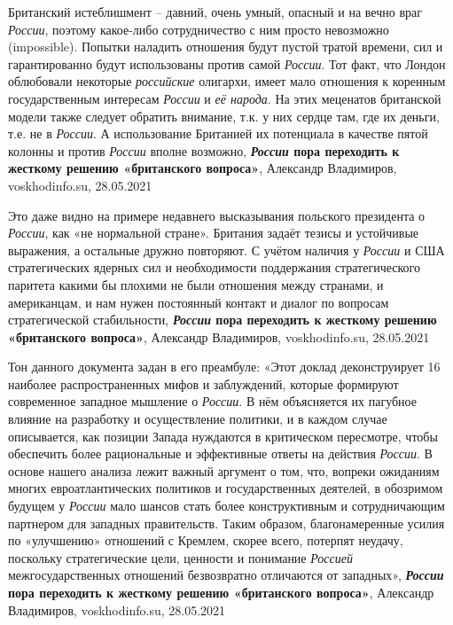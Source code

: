 Британский истеблишмент – давний, очень умный, опасный и на вечно враг \emph{России},
поэтому какое-либо сотрудничество с ним просто невозможно (impossible). Попытки
наладить отношения будут пустой тратой времени, сил и гарантированно будут
использованы против самой \emph{России}.  Тот факт, что Лондон облюбовали некоторые
\emph{российские} олигархи, имеет мало отношения к коренным государственным интересам
\emph{России} и \emph{её народа}. На этих меценатов британской модели также следует обратить
внимание, т.к. у них сердце там, где их деньги, т.е. не в \emph{России}. А
использование Британией их потенциала в качестве пятой колонны и против \emph{России}
вполне возможно,
\textbf{\emph{России} пора переходить к жесткому решению «британского вопроса»}, 
Александр Владимиров, voskhodinfo.su, 28.05.2021

Это даже видно на примере недавнего высказывания польского президента о \emph{России},
как «не нормальной стране». Британия задаёт тезисы и устойчивые выражения, а
остальные дружно повторяют. С учётом наличия у \emph{России} и США стратегических
ядерных сил и необходимости поддержания стратегического паритета какими бы
плохими не были отношения между странами, и американцам, и нам нужен постоянный
контакт и диалог по вопросам стратегической стабильности,
\textbf{\emph{России} пора переходить к жесткому решению «британского вопроса»}, 
Александр Владимиров, voskhodinfo.su, 28.05.2021

Тон данного документа задан в его преамбуле: «Этот доклад деконструирует 16
наиболее распространенных мифов и заблуждений, которые формируют современное
западное мышление о \emph{России}. В нём объясняется их пагубное влияние на
разработку и осуществление политики, и в каждом случае описывается, как позиции
Запада нуждаются в критическом пересмотре, чтобы обеспечить более рациональные
и эффективные ответы на действия \emph{России}. В основе нашего анализа лежит
важный аргумент о том, что, вопреки ожиданиям многих евроатлантических
политиков и государственных деятелей, в обозримом будущем у \emph{России} мало
шансов стать более конструктивным и сотрудничающим партнером для западных
правительств. Таким образом, благонамеренные усилия по «улучшению» отношений с
Кремлем, скорее всего, потерпят неудачу, поскольку стратегические цели,
ценности и понимание \emph{Россией} межгосударственных отношений безвозвратно
отличаются от западных»,
\textbf{\emph{России} пора переходить к жесткому решению «британского вопроса»}, 
Александр Владимиров, voskhodinfo.su, 28.05.2021

